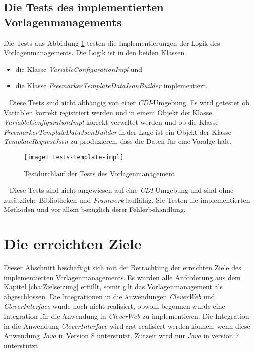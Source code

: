 \subsection{Die Tests des implementierten Vorlagenmanagements}
Die Tests aus Abbildung \ref{fig:tests-template-impl} testen die Implementierungen der Logik des Vorlagenmanagements. Die Logik ist in den beiden Klassen 
\begin{itemize}
	\item die Klasse \emph{VariableConfigurationImpl} und
	\item die Klasse \emph{FreemarkerTemplateDataJsonBuilder} implementiert.
\end{itemize}
\ \newline
Diese Tests sind nicht abhängig von einer \emph{CDI}-Umgebung. Es wird getestet ob Variablen korrekt registriert werden und in einem Objekt der Klasse \emph{VariableConfigurationImpl} korrekt verwaltet werden und ob die Klasse \emph{FreemarkerTemplateDataJsonBuilder} in der Lage ist ein Objekt der Klasse \emph{TemplateRequestJson} zu produzieren, dass die Daten für eine Voralge hält.
\newpage
\begin{figure}[h]
\centering
\texttt{[image: tests-template-impl]}
\caption{Testdurchlauf der Tests des Vorlagenmanagement}
\label{fig:tests-template-impl}
\end{figure}
\ \newline
Diese Tests sind nicht angewiesen auf eine \emph{CDI}-Umgebung und sind ohne zusätzliche Bibliotheken und \emph{Framwork} lauffähig. Sie Testen die implementierten Methoden und vor allem bezüglich derer Fehlerbehandlung.

\section{Die erreichten Ziele}
Dieser Abschnitt beschäftigt sich mit der Betrachtung der erreichten Ziele des implementierten Vorlagenmanagements. Es wurden alle Anforderung aus dem Kapitel \ref{cha:Zielsetzung} erfüllt, somit gilt das Vorlagenmanagement als abgeschlossen. Die Integrationen in die Anwendungen \emph{CleverWeb} und \emph{CleverInterface} wurde noch nicht realisiert, obwohl begonnen wurde eine Integration für die Anwendung in \emph{CleverWeb} zu implementieren. Die Integration in die Anwendung \emph{CleverInterface} wird erst realisiert werden können, wenn diese Anwendung \emph{Java} in Version 8 unterstützt. Zurzeit wird nur \emph{Java} in version 7 unterstützt. 

